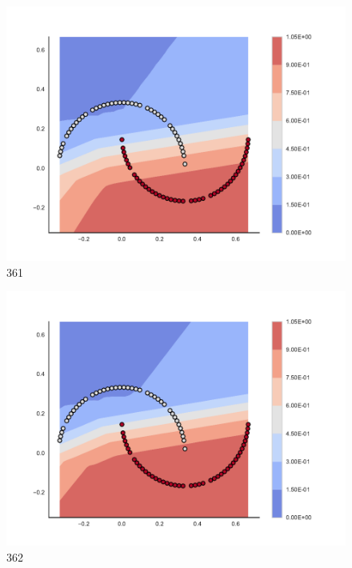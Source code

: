 \begin{subfigure}[b]{0.09\textwidth}
    \includegraphics[clip, trim=2.35cm 1.75cm 4.5cm 0cm,width=\textwidth]{img/convergence/361.pdf}
    \caption{361}
    \label{fig:convergence_361}
\end{subfigure}
%
\begin{subfigure}[b]{0.09\textwidth}
    \includegraphics[clip, trim=2.35cm 1.75cm 4.5cm 0cm,width=\textwidth]{img/convergence/362.pdf}
    \caption{362}
    \label{fig:convergence_362}
\end{subfigure}
%
